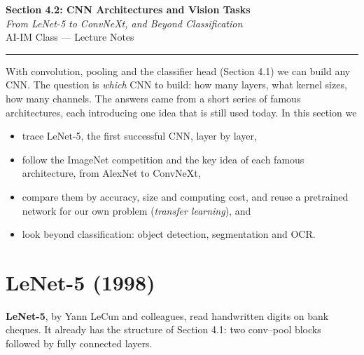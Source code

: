 \documentclass[12pt, a4paper]{article}
\begin{document}
\begin{center}
  {\LARGE \textbf{Section 4.2: CNN Architectures and Vision Tasks}} \\[0.3em]
  {\large\itshape From LeNet-5 to ConvNeXt, and Beyond Classification} \\[0.5em]
  {\large AI-IM Class --- Lecture Notes}%
  \ifstudentmode
  \fi
\end{center}

\vspace{1em}
\hrule
\vspace{1.5em}

With convolution, pooling and the classifier head (Section 4.1) we can build
any CNN. The question is \emph{which} CNN to build: how many layers, what
kernel sizes, how many channels. The answers came from a short series of
famous architectures, each introducing one idea that is still used today.
In this section we
\begin{itemize}[nosep]
  \item trace LeNet-5, the first successful CNN, layer by layer,
  \item follow the ImageNet competition and the key idea of each famous
        architecture, from AlexNet to ConvNeXt,
  \item compare them by accuracy, size and computing cost, and reuse a
        pretrained network for our own problem (\emph{transfer learning}),
        and
  \item look beyond classification: object detection, segmentation and OCR.
\end{itemize}

\section{LeNet-5 (1998)}

\textbf{LeNet-5}, by Yann LeCun and colleagues, read handwritten digits on
bank cheques. It already has the structure of Section 4.1: two conv--pool
blocks followed by fully connected layers.
\end{document}
